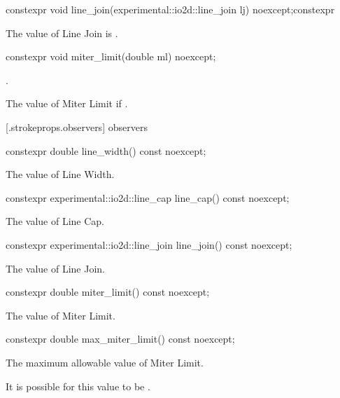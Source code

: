 \begin{itemdecl}
constexpr void line_join(experimental::io2d::line_join lj) noexcept;constexpr \end{itemdecl}
\begin{itemdescr}
\pnum
\effects
The value of Line Join is .
\end{itemdescr}

\begin{itemdecl}
constexpr void miter_limit(double ml) noexcept;
\end{itemdecl}
\begin{itemdescr}
\pnum
\requires
{}.

\pnum
The value of Miter Limit if .
\end{itemdescr}

 [\iotwod.strokeprops.observers] { observers}

\begin{itemdecl}
constexpr double line_width() const noexcept;
\end{itemdecl}
\begin{itemdescr}
\pnum
\returns
The value of Line Width.
\end{itemdescr}

\begin{itemdecl}
constexpr experimental::io2d::line_cap line_cap() const noexcept;
\end{itemdecl}
\begin{itemdescr}
\pnum
\returns
The value of Line Cap.
\end{itemdescr}

\begin{itemdecl}
constexpr experimental::io2d::line_join line_join() const noexcept;
\end{itemdecl}
\begin{itemdescr}
\pnum
\returns
The value of Line Join.
\end{itemdescr}

\begin{itemdecl}
constexpr double miter_limit() const noexcept;
\end{itemdecl}
\begin{itemdescr}
\pnum
\returns
The value of Miter Limit.
\end{itemdescr}

\begin{itemdecl}
constexpr double max_miter_limit() const noexcept;
\end{itemdecl}
\begin{itemdescr}
\pnum
\returns
The  maximum allowable value of Miter Limit.

\pnum
\remarks
It is possible for this value to be .
\end{itemdescr}
